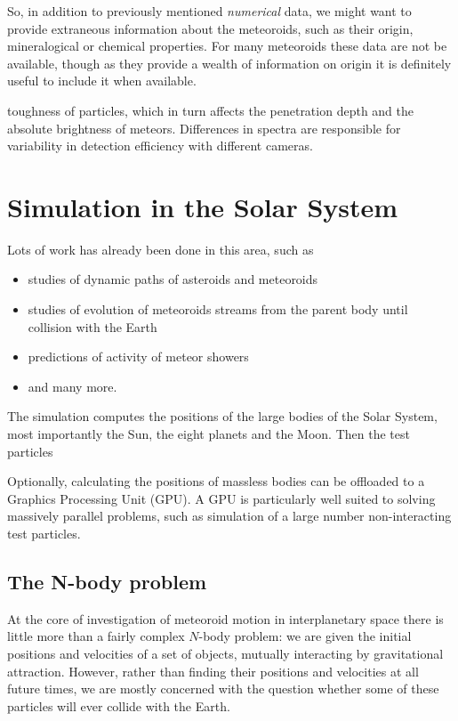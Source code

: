                 So, in addition to previously mentioned \textit{numerical} data, we might want to
                provide extraneous information about the meteoroids, such as their origin,
                mineralogical or chemical properties.
                For many meteoroids these data are not be available,
                though as they provide a wealth of information on origin
                it is definitely useful to include it when available.


                toughness of particles, which in turn affects the penetration depth
                and the absolute brightness of meteors.
                Differences in spectra are responsible for variability in detection efficiency with different cameras.


\section{Simulation in the Solar System} \label{ms}
    Lots of work has already been done in this area, such as
    \begin{itemize}
        \item studies of dynamic paths of asteroids and meteoroids
        \item studies of evolution of meteoroids streams from the parent body until collision with the Earth
        \item predictions of activity of meteor showers
        \item and many more.
    \end{itemize}

    The simulation computes the positions of the large bodies of the Solar System, most importantly the Sun,
    the eight planets and the Moon. Then the test particles

    Optionally, calculating the positions of massless bodies can be offloaded to a Graphics Processing Unit (GPU).
    A GPU is particularly well suited to solving massively parallel problems,
    such as simulation of a large number non-interacting test particles.

    \subsection{The N-body problem} \label{msN}
        At the core of investigation of meteoroid motion in interplanetary space
        there is little more than a fairly complex $N$-body problem:
        we are given the initial positions and velocities of a set of objects,
        mutually interacting by gravitational attraction.
        However, rather than finding their positions and velocities at all future times, we are mostly concerned
        with the question whether some of these particles will ever collide with the Earth.

